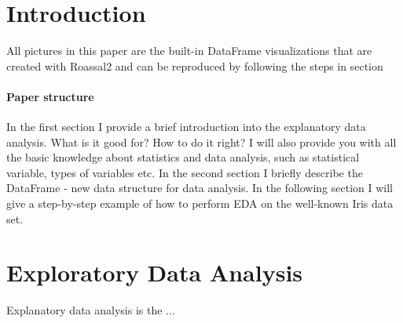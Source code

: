\documentclass{article}
\begin{document}
\begin{multicols}{2}
\section{Introduction}
\label{sec:intro}

%
%
%
%

All pictures in this paper are the built-in DataFrame visualizations that are created with Roassal2 and can be reproduced by following the steps in section \

\paragraph{Paper structure} In the first section I provide a brief introduction into the explanatory data analysis. What is it good for? How to do it right? I will also provide you with all the basic knowledge about statistics and data analysis, such as statistical variable, types of variables etc. In the second section I briefly describe the DataFrame - new data structure for data analysis. In the following section I will give a step-by-step example of how to perform EDA on the well-known Iris data set.





%
%
%
%

\section{Exploratory Data Analysis}
\label{sec:eda}
Explanatory data analysis is the ...


\end{multicols}
\end{document}
